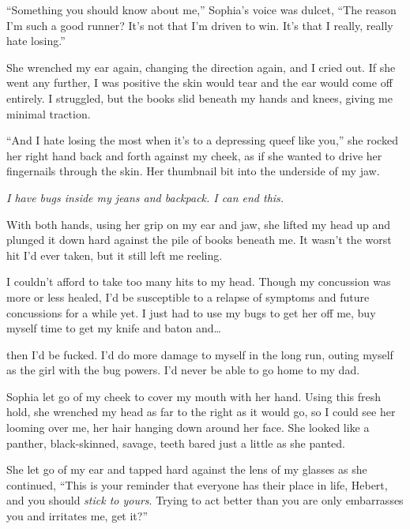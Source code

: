 ``Something you should know about me,'' Sophia's voice was dulcet, ``The reason I'm such a good runner?  It's not that I'm driven to win.  It's that I really, really hate losing.''



She wrenched my ear again, changing the direction again, and I cried out.  If she went any further, I was positive the skin would tear and the ear would come off entirely.  I struggled, but the books slid beneath my hands and knees, giving me minimal traction.



``And I hate losing the most when it's to a depressing queef like you,'' she rocked her right hand back and forth against my cheek, as if she wanted to drive her fingernails through the skin.  Her thumbnail bit into the underside of my jaw.



\emph{I have bugs inside my jeans and backpack.  I can end this.}



With both hands, using her grip on my ear and jaw, she lifted my head up and plunged it down hard against the pile of books beneath me.  It wasn't the worst hit I'd ever taken, but it still left me reeling.



I couldn't afford to take too many hits to my head.  Though my concussion was more or less healed, I'd be susceptible to a relapse of symptoms and future concussions for a while yet.  I just had to use my bugs to get her off me, buy myself time to get my knife and baton and\ldots



\ldotsand then I'd be fucked.  I'd do more damage to myself in the long run, outing myself as the girl with the bug powers.  I'd never be able to go home to my dad.



Sophia let go of my cheek to cover my mouth with her hand.  Using this fresh hold, she wrenched my head as far to the right as it would go, so I could see her looming over me, her hair hanging down around her face.  She looked like a panther, black-skinned, savage, teeth bared just a little as she panted.



She let go of my ear and tapped hard against the lens of my glasses as she continued, ``This is your reminder that everyone has their place in life, Hebert, and you should \emph{stick to yours}.  Trying to act better than you are only embarrasses you and irritates me, get it?''



